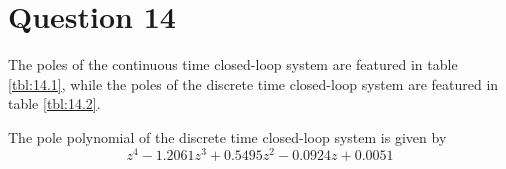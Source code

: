 \section{Question 14}

The poles of the continuous time closed-loop system are featured in table
\ref{tbl:14.1}, while the poles of the discrete time closed-loop system are
featured in table \ref{tbl:14.2}.

\begin{table}
\centering
{}
\end{table}

The pole polynomial of the discrete time closed-loop system is given by
$$z^4 - 1.2061z^3 + 0.5495z^2 - 0.0924z + 0.0051$$
